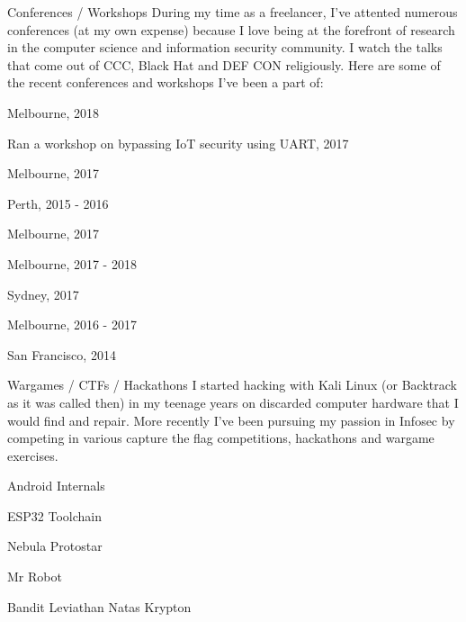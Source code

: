 \begin{cventries}
    \cventrysimple
        {Conferences / Workshops}
        {
            During my time as a freelancer, I've attented numerous conferences (at my own expense) because I love being at the forefront of research in the computer science and information security community. I watch the talks that come out of CCC, Black Hat and DEF CON religiously. Here are some of the recent conferences and workshops I've been a part of:
        }
        {
            \begin{cvitems}
                \item { \acvSubItemSep Melbourne, 2018}
                \item { \acvSubItemSep Ran a workshop on bypassing IoT security using UART, 2017}
                \item { \acvSubItemSep Melbourne, 2017}
                \item { \acvSubItemSep Perth, 2015 - 2016}
                \item { \acvSubItemSep Melbourne, 2017}
                \item { \acvSubItemSep Melbourne, 2017 - 2018}
                \item { \acvSubItemSep Sydney, 2017}
                \item { \acvSubItemSep Melbourne, 2016 - 2017}
                \item { \acvSubItemSep San Francisco, 2014}
            \end{cvitems}
        }


    \cventrysimple
        {Wargames / CTFs / Hackathons}
        {
            I started hacking with Kali Linux (or Backtrack as it was called then) in my teenage years on discarded computer hardware that I would find and repair. More recently I've been pursuing my passion in Infosec by competing in various capture the flag competitions, hackathons and wargame exercises.
        }
        {
            \begin{cvitems}
                \item { }
                \item { \acvSubItemSep Android Internals}
                \item { \acvSubItemSep ESP32 Toolchain}
                \item { \acvSubItemSep Nebula \acvSubItemSep Protostar}
                \item { \acvSubItemSep Mr Robot}
                \item { \acvSubItemSep Bandit \acvSubItemSep Leviathan \acvSubItemSep Natas \acvSubItemSep Krypton}
            \end{cvitems}
        }


\end{cventries}
